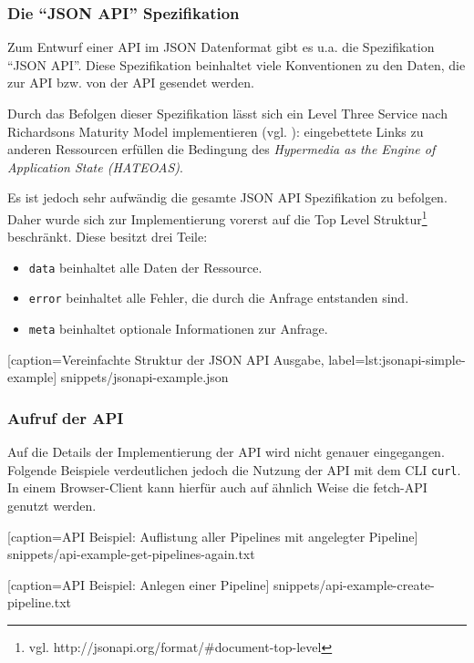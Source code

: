 \subsubsection{Die ``JSON API'' Spezifikation}
\label{subsec:jsonapi}

Zum Entwurf einer API im JSON Datenformat gibt es u.a. die Spezifikation ``JSON API''. Diese Spezifikation beinhaltet viele Konventionen zu den Daten, die zur API bzw. von der API gesendet werden.

Durch das Befolgen dieser Spezifikation lässt sich ein Level Three Service nach Richardsons Maturity Model implementieren (vgl. \citep[20]{Webber2010}): eingebettete Links zu anderen Ressourcen erfüllen die Bedingung des \emph{Hypermedia as the Engine of Application State (HATEOAS)}.

Es ist jedoch sehr aufwändig die gesamte JSON API Spezifikation zu befolgen. Daher wurde sich zur Implementierung vorerst auf die Top Level Struktur\footnote{vgl. http://jsonapi.org/format/\#document-top-level} beschränkt. Diese besitzt drei Teile:

\begin{itemize}
  \item \texttt{data} beinhaltet alle Daten der Ressource.
  \item \texttt{error} beinhaltet alle Fehler, die durch die Anfrage entstanden sind.
  \item \texttt{meta} beinhaltet optionale Informationen zur Anfrage.
\end{itemize}


  [caption={Vereinfachte Struktur der JSON API Ausgabe},
  label={lst:jsonapi-simple-example}]
  {snippets/jsonapi-example.json}

\subsubsection{Aufruf der API}
\label{subsec:api-usage}

Auf die Details der Implementierung der API wird nicht genauer eingegangen. Folgende Beispiele verdeutlichen jedoch die Nutzung der API mit dem \ac{CLI} \texttt{curl}. In einem Browser-Client kann hierfür auch auf ähnlich Weise die fetch-API genutzt werden.


  [caption={API Beispiel: Auflistung aller Pipelines mit angelegter Pipeline}]
  {snippets/api-example-get-pipelines-again.txt}


  [caption={API Beispiel: Anlegen einer Pipeline}]
  {snippets/api-example-create-pipeline.txt}

